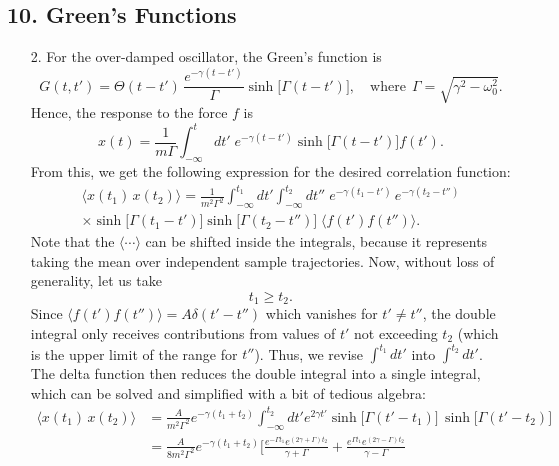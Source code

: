 \documentclass[10pt,a4paper]{article}
\begin{document}
\subsection*{10. Green's Functions}

\begin{enumerate}
\item [2.]
For the over-damped oscillator, the Green's function is
\begin{equation}
  G(t,t') = \Theta(t-t')\, \frac{e^{-\gamma(t-t')}}{\Gamma} \sinh\big[\Gamma(t-t')\big], \quad\mathrm{where}\;\,\Gamma = \sqrt{\gamma^2 - \omega_0^2}.
\end{equation}
Hence, the response to the force $f$ is
\begin{equation}
  x(t) = \frac{1}{m\Gamma} \int^t_{-\infty} dt'\; e^{-\gamma(t-t')} \sinh\big[\Gamma(t-t')\big] f(t').
\end{equation}
From this, we get the following expression for the desired correlation
function:
\begin{multline}
  \langle x(t_1)\, x(t_2)\rangle = \frac{1}{m^2\Gamma^2} \int^{t_1}_{-\infty} dt' \int^{t_2}_{-\infty} dt'' \; e^{-\gamma(t_1-t')}\, e^{-\gamma(t_2-t'')} \\
  \times \sinh\big[\Gamma(t_1-t')\big] \sinh\big[\Gamma(t_2-t'')\big] \;
  \langle f(t') f(t'')\rangle.
\end{multline}
Note that the $\langle\cdots\rangle$ can be shifted inside the
integrals, because it represents taking the mean over independent sample
trajectories. Now, without loss of generality, let us take
\begin{equation}
  t_1 \ge t_2.
\end{equation}
Since $\langle f(t') f(t'')\rangle = A \delta(t'-t'')$ which vanishes
for $t' \ne t''$, the double integral only receives contributions from
values of $t'$ not exceeding $t_2$ (which is the upper limit of the
range for $t''$). Thus, we revise $\int^{t_1} dt'$ into $\int^{t_2}
dt'$. The delta function then reduces the double integral into a
single integral, which can be solved and simplified with a bit of
tedious algebra:
\begin{align}
  \langle x(t_1)\, x(t_2)\rangle &= \frac{A}{m^2\Gamma^2} e^{-\gamma(t_1+t_2)} \int^{t_2}_{-\infty} dt' e^{2\gamma t'} \sinh\big[\Gamma(t'-t_1)\big] \, \sinh\big[\Gamma(t'-t_2)\big] \\
  &= \frac{A}{8m^2\Gamma^2} e^{-\gamma(t_1+t_2)}\Bigg[\frac{e^{-\Gamma t_1} e^{(2\gamma+\Gamma)t_2}}{\gamma+\Gamma} + \frac{e^{\Gamma t_1}e^{(2\gamma-\Gamma)t_2}}{\gamma-\Gamma} \nonumber \\

\end{align}
\end{enumerate}
\end{document}
